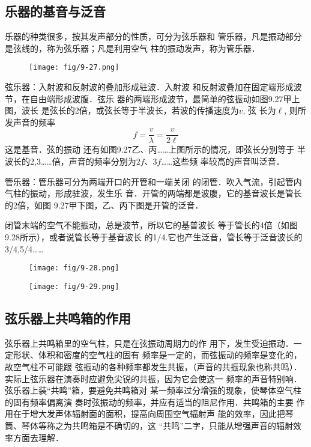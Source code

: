 \subsection{乐器的基音与泛音}

乐器的种类很多，按其发声部分的性质，可分为弦乐器和
管乐器，凡是振动部分是弦线的，称为弦乐器；凡是利用空气
柱的振动发声，称为管乐器．

\begin{figure}[htp]
    \centering
    \texttt{[image: fig/9-27.png]}
    \caption{}
\end{figure}

弦乐器：入射波和反射波的叠加形成驻波．入射波
和反射波叠加在固定端形成波节，在自由端形成波腹．弦乐
器的两端形成波节，最简单的弦振动如图9.27甲上图，波长
是弦长的2倍，或弦长等于半波长，若波的传播速度为$v$, 弦
长为$\ell$, 则所发声音的频率
\[f=\frac{v}{\lambda}=\frac{v}{2\ell}\]
这是基音．弦的振动
还有如图9.27乙、丙……上图所示的情况，即弦长分别等于
半波长的2,3……倍，声音的频率分别为$2f$、$3f$……这些频
率较高的声音叫泛音．

管乐器：管乐器可分为两端开口的开管和一端关闭
的闭管．吹入气流，引起管内气柱的振动，形成驻波，发生乐
音．开管的两端都是波腹，它的基音波长是管长的2倍，如图
9.27甲下图，乙、丙下图是开管的泛音．

闭管末端的空气不能振动，总是波节，所以它的基普波长
等于管长的4倍（如图9.28所示），或者说管长等于基音波长
的1/4.它也产生泛音，管长等于泛音波长的3/4,5/4……

\begin{figure}[htp]\centering
    \begin{minipage}[t]{0.48\textwidth}
    \centering
\texttt{[image: fig/9-28.png]}
    \caption{}
    \end{minipage}
    \begin{minipage}[t]{0.48\textwidth}
    \centering
\texttt{[image: fig/9-29.png]}
    \caption{}
    \end{minipage}
    \end{figure}

\subsection{弦乐器上共鸣箱的作用}
弦乐器上共鸣箱里的空气柱，只是在弦振动周期力的作
用下，发生受迫振动．一定形状、体积和密度的空气柱的固有
频率是一定的，而弦振动的频率是变化的，故空气柱不可能跟
弦振动的各种频率都发生共振，（声音的共振现象也称共鸣）．
实际上弦乐器在演奏时应避免尖锐的共振，因为它会使这一
频率的声音特别响．弦乐器上装“共鸣”箱，要避免共鸣箱对
某一频率过分增强的现象，使琴体空气柱的固有频率偏离演
奏时弦振动的频率，并应有适当的阻尼作用．共鸣箱的主要
作用在于增大发声体辐射面的面积，提高向周围空气辐射声
能的效率，因此把琴筒、琴体等称之为共鸣箱是不确切的，这
“共鸣”二字，只能从增强声音的辐射效率方面去理解．

